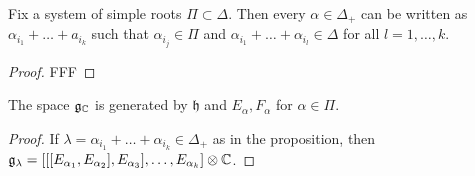 \documentclass[11pt, english]{article}
\begin{document}
\begin{prop}
 Fix a system of simple roots $\Pi \subset \Delta$. Then every $\alpha \in \Delta_+$ can be written as $\alpha_{i_1}+\ldots+a_{i_k}$ such that $\alpha_{i_j} \in \Pi$ and $\alpha_{i_1}+\ldots+\alpha_{i_l} \in \Delta$ for all $l=1,\ldots,k$. 
\end{prop}
\begin{proof}
  FFF
\end{proof}

\begin{corr}
The space  $\mathfrak g_{\mathbb{C}}$ is generated by $\mathfrak h$ and $E_\alpha, F_\alpha$ for $\alpha \in \Pi$.
\end{corr}
\begin{proof}
  If $\lambda = \alpha_{i_1}+\ldots+\alpha_{i_k} \in \Delta_+$ as in the proposition, then $\mathfrak g_\lambda = [[[E_{\alpha_1},E_{\alpha_2}],E_{\alpha_3}],\ldots, E_{\alpha_k}] \otimes \mathbb{C}$. 
\end{proof}
\end{document}
